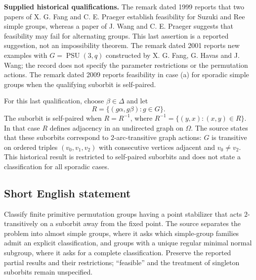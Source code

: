 \documentclass[11pt]{article}
\begin{document}
\textbf{Supplied historical qualifications.} The remark dated 1999 reports that two papers of X. G. Fang and C. E. Praeger establish feasibility for Suzuki and Ree simple groups, whereas a paper of J. Wang and C. E. Praeger suggests that feasibility may fail for alternating groups. This last assertion is a reported suggestion, not an impossibility theorem. The remark dated 2001 reports new examples with \(G=\operatorname{PSU}(3,q)\) constructed by X. G. Fang, G. Havas and J. Wang; the record does not specify the parameter restrictions or the permutation actions. The remark dated 2009 reports feasibility in case (a) for sporadic simple groups when the qualifying suborbit is self-paired.

For this last qualification, choose \(\beta\in\Delta\) and let
\[
R=\{(g\alpha,g\beta):g\in G\}.
\]
The suborbit is self-paired when \(R=R^{-1}\), where \(R^{-1}=\{(y,x):(x,y)\in R\}\). In that case \(R\) defines adjacency in an undirected graph on \(\Omega\). The source states that these suborbits correspond to \(2\)-arc-transitive graph actions: \(G\) is transitive on ordered triples \((v_0,v_1,v_2)\) with consecutive vertices adjacent and \(v_0\ne v_2\). This historical result is restricted to self-paired suborbits and does not state a classification for all sporadic cases.
\subsection{Short English statement}
Classify finite primitive permutation groups having a point stabilizer that acts \(2\)-transitively on a suborbit away from the fixed point. The source separates the problem into almost simple groups, where it asks which simple-group families admit an explicit classification, and groups with a unique regular minimal normal subgroup, where it asks for a complete classification. Preserve the reported partial results and their restrictions; ``feasible'' and the treatment of singleton suborbits remain unspecified.
\end{document}
